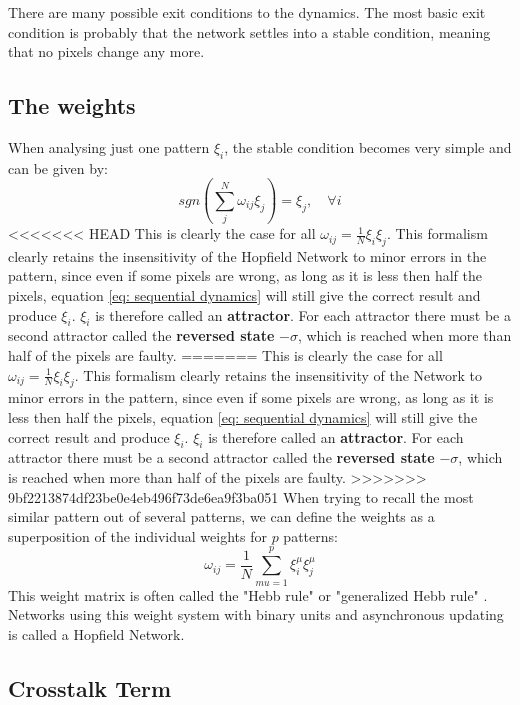There are many possible exit conditions to the dynamics. The most basic exit condition is probably that the network settles into a stable condition, meaning that no pixels change any more. 

\subsection{The weights}
When analysing just one pattern $\xi_i$, the stable condition becomes very simple and can be given by:
\begin{equation}
sgn\left( \sum_j^N \omega_{ij} \xi_j \right) = \xi_j, \quad	\forall i
\end{equation}
<<<<<<< HEAD
This is clearly the case for all $\omega_{ij}=\frac{1}{N} \xi_i \xi_j$. This formalism clearly retains the insensitivity of the Hopfield Network to minor errors in the pattern, since even if some pixels are wrong, as long as it is less then half the pixels, equation \ref{eq: sequential dynamics} will still give the correct result and produce $\xi_i$. $\xi_i$ is therefore called an \textbf{attractor}. For each attractor there must be a second attractor called the \textbf{reversed state} $-\sigma$, which is reached when more than half of the pixels are faulty. 
=======
This is clearly the case for all $\omega_{ij}=\frac{1}{N} \xi_i \xi_j$. This formalism clearly retains the insensitivity of the Network to minor errors in the pattern, since even if some pixels are wrong, as long as it is less then half the pixels, equation \ref{eq: sequential dynamics} will still give the correct result and produce $\xi_i$. $\xi_i$ is therefore called an \textbf{attractor}. For each attractor there must be a second attractor called the \textbf{reversed state} $-\sigma$, which is reached when more than half of the pixels are faulty. 
>>>>>>> 9bf2213874df23be0e4eb496f73de6ea9f3ba051
When trying to recall the most similar pattern out of several patterns, we can define the weights as a superposition of the individual weights for $p$ patterns:
\begin{equation}
\omega_{ij}=\frac{1}{N} \sum_{mu=1}^p \xi_i^\mu \xi_j^\mu
\end{equation}
This weight matrix is often called the "Hebb rule" or "generalized Hebb rule" \citep{Polk:2002fk}. Networks using this weight system with binary units and asynchronous updating is called a Hopfield Network. 

\subsection{Crosstalk Term}


